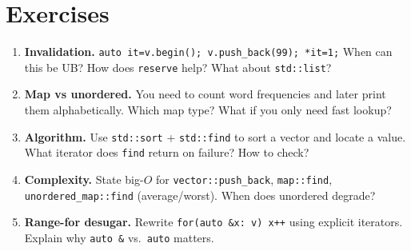 \section{Exercises}
\begin{enumerate}[label=E7.\arabic*, leftmargin=*, itemsep=0.6em]
\item \textbf{Invalidation.} \texttt{auto it=v.begin(); v.push\_back(99); *it=1;} When can this be UB? How does \texttt{reserve} help? What about \texttt{std::list}?
\item \textbf{Map vs unordered.} You need to count word frequencies and later print them alphabetically. Which map type? What if you only need fast lookup?
\item \textbf{Algorithm.} Use \texttt{std::sort} + \texttt{std::find} to sort a vector and locate a value. What iterator does \texttt{find} return on failure? How to check?
\item \textbf{Complexity.} State big-$O$ for \texttt{vector::push\_back}, \texttt{map::find}, \texttt{unordered\_map::find} (average/worst). When does unordered degrade?
\item \textbf{Range-for desugar.} Rewrite \texttt{for(auto \&x: v) x++} using explicit iterators. Explain why \texttt{auto \&} vs.\ \texttt{auto} matters.
\end{enumerate}
